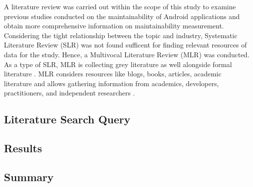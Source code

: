 A literature review was carried out within the scope of this study to examine previous studies conducted on the maintainability of Android applications and obtain more comprehensive information on maintainability measurement. Considering the tight relationship between the topic and industry, Systematic Literature Review (SLR) was not found sufficent for finding relevant resources of data for the study. Hence, a Multivocal Literature Review (MLR) was conducted. As a type of SLR, MLR is collecting grey literature as well alongside formal literature \cite{40}. MLR considers resources like blogs, books, articles, academic literature and allows gathering information from academics, developers, practitioners, and independent researchers \cite{41}.

\subsection{Literature Search Query}


\subsection{Results}
\label{section:3.2}


\subsection{Summary}
